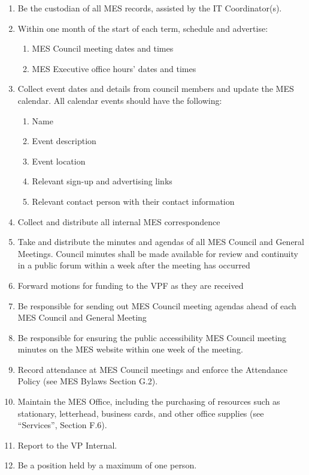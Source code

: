 \begin{enumerate}
 \item
  Be the custodian of all MES records, assisted by the IT
  Coordinator(s).
 \item
  Within one month of the start of each term, schedule and advertise:

  \begin{enumerate}
   \item
    MES Council meeting dates and times
   \item
    MES Executive office hours' dates and times
  \end{enumerate}
 \item
  Collect event dates and details from council members and update the
  MES calendar. All calendar events should have the following:

  \begin{enumerate}
   \item
    Name
   \item
    Event description
   \item
    Event location
   \item
    Relevant sign-up and advertising links
   \item
    Relevant contact person with their contact information
  \end{enumerate}
 \item
  Collect and distribute all internal MES correspondence
 \item
  Take and distribute the minutes and agendas of all MES Council and
  General Meetings. Council minutes shall be made available for review
  and continuity in a public forum within a week after the meeting has
  occurred
 \item
  Forward motions for funding to the VPF as they are received
 \item
  Be responsible for sending out MES Council meeting agendas ahead of
  each MES Council and General Meeting
 \item
  Be responsible for ensuring the public accessibility MES Council
  meeting minutes on the MES website within one week of the meeting.
 \item
  Record attendance at MES Council meetings and enforce the Attendance
  Policy (see MES Bylaws Section G.2).
 \item
  Maintain the MES Office, including the purchasing of resources such as
  stationary, letterhead, business cards, and other office supplies (see
  ``Services'', Section F.6).
 \item
  Report to the VP Internal.
 \item
  Be a position held by a maximum of one person.

\end{enumerate}

